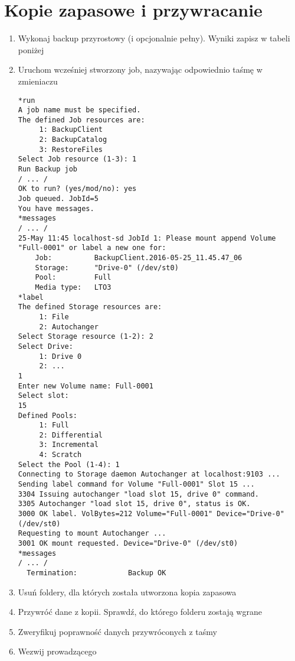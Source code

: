 \documentclass[polish]{article}
\begin{document}
\section*{Kopie zapasowe i przywracanie}

\begin{enumerate}

\item Wykonaj backup przyrostowy (i opcjonalnie pełny). Wyniki zapisz w tabeli poniżej

\item Uruchom wcześniej stworzony job, nazywając odpowiednio taśmę w zmieniaczu
\begin{verbatim}
*run
A job name must be specified.
The defined Job resources are:
     1: BackupClient
     2: BackupCatalog
     3: RestoreFiles
Select Job resource (1-3): 1
Run Backup job
/ ... /
OK to run? (yes/mod/no): yes
Job queued. JobId=5
You have messages.
*messages
/ ... /
25-May 11:45 localhost-sd JobId 1: Please mount append Volume "Full-0001" or label a new one for:
    Job:          BackupClient.2016-05-25_11.45.47_06
    Storage:      "Drive-0" (/dev/st0)
    Pool:         Full
    Media type:   LTO3
*label
The defined Storage resources are:
     1: File
     2: Autochanger
Select Storage resource (1-2): 2
Select Drive:
     1: Drive 0
     2: ...
1
Enter new Volume name: Full-0001
Select slot:
15
Defined Pools:
     1: Full
     2: Differential
     3: Incremental
     4: Scratch
Select the Pool (1-4): 1
Connecting to Storage daemon Autochanger at localhost:9103 ...
Sending label command for Volume "Full-0001" Slot 15 ...
3304 Issuing autochanger "load slot 15, drive 0" command.
3305 Autochanger "load slot 15, drive 0", status is OK.
3000 OK label. VolBytes=212 Volume="Full-0001" Device="Drive-0" (/dev/st0)
Requesting to mount Autochanger ...
3001 OK mount requested. Device="Drive-0" (/dev/st0)
*messages
/ ... /
  Termination:            Backup OK
\end{verbatim}

\item Usuń foldery, dla których została utworzona kopia zapasowa

\item Przywróć dane z kopii. Sprawdź, do którego folderu zostają wgrane

\item Zweryfikuj poprawność danych przywróconych z taśmy

\item Wezwij prowadzącego

\end{enumerate}
\end{document}
